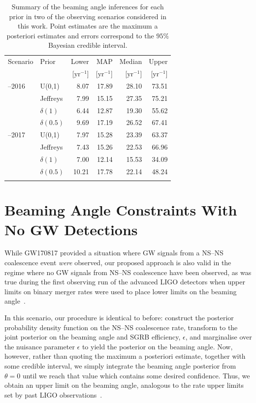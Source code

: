 \documentclass[twocolumn,nofootinbib]{revtex4-1}
\newcommand{\yr}{\mathrm{yr}}
\newcommand{\BNS}{\ac{NS}--\ac{NS}\xspace}
\begin{document}
\begin{table}
\centering
\begin{tabular}{llrrrr}
  \toprule
  Scenario & Prior & Lower & MAP & Median & Upper \\
  && [$\yr^{-1}$] & [$\yr^{-1}$]    & [$\yr^{-1}$]    & [$\yr^{-1}$]  \\
  \colrule
2015--2016  & U(0,1) 	 & 8.07	 & 17.89	& 28.10	& 73.51	 \\
& Jeffreys 	 & 7.99	 & 15.15	& 27.35	& 75.21	 \\
& $\delta(1)$ 	 & 6.44	 & 12.87	& 19.30	& 55.62	 \\
& $\delta(0.5)$ 	 & 9.69	 & 17.19	& 26.52	& 67.41 \\
  \colrule
2016--2017  & U(0,1) 	 & 7.97	 & 15.28	& 23.39	& 63.37	 \\
& Jeffreys 	 & 7.43	 & 15.26	& 22.53	& 66.96	 \\
& $\delta(1)$ 	 & 7.00	 & 12.14	& 15.53	& 34.09	 \\
& $\delta(0.5)$ 	 & 10.21	 & 17.78	& 22.14	& 48.24	 \\
\botrule
\end{tabular}
\caption{Summary of the beaming angle inferences for each prior in two of the observing scenarios considered in this work.
    Point estimates are the maximum a posteriori estimates and errors correspond to the $95\%$ Bayesian credible interval.
    \label{tab:aligo_beam_inference}}
\end{table}

\section{Beaming Angle Constraints With No \ac{GW} Detections}
\label{sec:beaming_limits}
While GW170817 provided a situation where \ac{GW} signals from a \BNS
coalescence event \emph{were} observed, our proposed approach is also
valid in the regime where no \ac{GW} signals from \BNS coalescence
have been observed, as was true during the first observing run of the
advanced LIGO detectors when upper limits on binary merger rates were
used to place lower limits on the beaming angle~\cite{Abbott:2016ymx}.

In this scenario, our procedure is identical to before:
construct the posterior probability density function on the \BNS
coalescence rate, transform to the joint posterior on the beaming
angle and \ac{SGRB} efficiency, $\epsilon$, and marginalise over the
nuisance parameter $\epsilon$ to yield the posterior on the beaming
angle.  Now, however, rather than quoting the maximum a posteriori
estimate, together with some credible interval, we simply integrate
the beaming angle posterior from $\theta=0$ until we reach that value
which contains some desired confidence.  Thus, we obtain an upper
limit on the beaming angle, analogous to the rate upper limits set by
past LIGO observations~\cite{Colaboration:2011np}.
\end{document}
